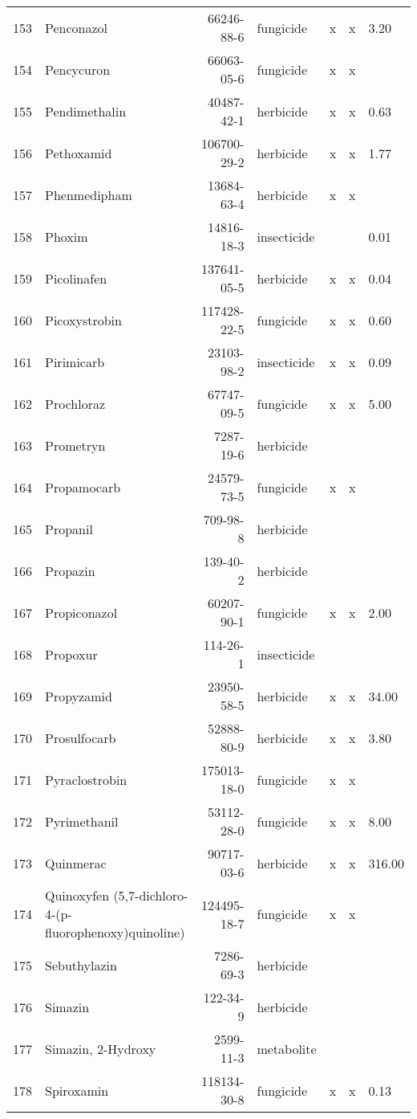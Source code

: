 \begin{longtable}{lp{3cm}rlp{0.5cm}p{0.5cm}p{1cm}}
  153 & Penconazol & 66246-88-6 & fungicide & x & x & 3.20 \\ 
  154 & Pencycuron & 66063-05-6 & fungicide & x & x &  \\ 
  155 & Pendimethalin & 40487-42-1 & herbicide & x & x & 0.63 \\ 
  156 & Pethoxamid & 106700-29-2 & herbicide & x & x & 1.77 \\ 
  157 & Phenmedipham & 13684-63-4 & herbicide & x & x &  \\ 
  158 & Phoxim & 14816-18-3 & insecticide &  &  & 0.01 \\ 
  159 & Picolinafen & 137641-05-5 & herbicide & x & x & 0.04 \\ 
  160 & Picoxystrobin & 117428-22-5 & fungicide & x & x & 0.60 \\ 
  161 & Pirimicarb & 23103-98-2 & insecticide & x & x & 0.09 \\ 
  162 & Prochloraz & 67747-09-5 & fungicide & x & x & 5.00 \\ 
  163 & Prometryn & 7287-19-6 & herbicide &  &  &  \\ 
  164 & Propamocarb & 24579-73-5 & fungicide & x & x &  \\ 
  165 & Propanil & 709-98-8 & herbicide &  &  &  \\ 
  166 & Propazin & 139-40-2 & herbicide &  &  &  \\ 
  167 & Propiconazol & 60207-90-1 & fungicide & x & x & 2.00 \\ 
  168 & Propoxur & 114-26-1 & insecticide &  &  &  \\ 
  169 & Propyzamid & 23950-58-5 & herbicide & x & x & 34.00 \\ 
  170 & Prosulfocarb & 52888-80-9 & herbicide & x & x & 3.80 \\ 
  171 & Pyraclostrobin & 175013-18-0 & fungicide & x & x &  \\ 
  172 & Pyrimethanil & 53112-28-0 & fungicide & x & x & 8.00 \\ 
  173 & Quinmerac & 90717-03-6 & herbicide & x & x & 316.00 \\ 
  174 & Quinoxyfen (5,7-dichloro-4-(p-fluorophenoxy)quinoline) & 124495-18-7 & fungicide & x & x &  \\ 
  175 & Sebuthylazin & 7286-69-3 & herbicide &  &  &  \\ 
  176 & Simazin & 122-34-9 & herbicide &  &  &  \\ 
  177 & Simazin, 2-Hydroxy & 2599-11-3 & metabolite &  &  &  \\ 
  178 & Spiroxamin & 118134-30-8 & fungicide & x & x & 0.13 \\ 

\end{longtable}
